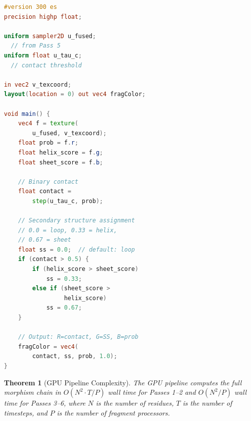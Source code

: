 \documentclass[11pt,twocolumn,a4paper]{article}
\newtheorem{theorem}{Theorem}[section]
\theoremstyle{definition}
\theoremstyle{remark}
\begin{document}
\begin{lstlisting}[language=GLSL,caption={Pass 6: Access (thresholding and secondary structure)},label=lst:pass6]
#version 300 es
precision highp float;

uniform sampler2D u_fused;
  // from Pass 5
uniform float u_tau_c;
  // contact threshold

in vec2 v_texcoord;
layout(location = 0) out vec4 fragColor;

void main() {
    vec4 f = texture(
        u_fused, v_texcoord);
    float prob = f.r;
    float helix_score = f.g;
    float sheet_score = f.b;

    // Binary contact
    float contact =
        step(u_tau_c, prob);

    // Secondary structure assignment
    // 0.0 = loop, 0.33 = helix,
    // 0.67 = sheet
    float ss = 0.0;  // default: loop
    if (contact > 0.5) {
        if (helix_score > sheet_score)
            ss = 0.33;
        else if (sheet_score >
                 helix_score)
            ss = 0.67;
    }

    // Output: R=contact, G=SS, B=prob
    fragColor = vec4(
        contact, ss, prob, 1.0);
}
\end{lstlisting}



\begin{theorem}[GPU Pipeline Complexity]
\label{thm:gpu_complexity}
The GPU pipeline computes the full morphism chain in $O(N^2 \cdot T / P)$ wall time for Passes 1--2 and $O(N^2 / P)$ wall time for Passes 3--6, where $N$ is the number of residues, $T$ is the number of timesteps, and $P$ is the number of fragment processors.
\end{theorem}
\end{document}

